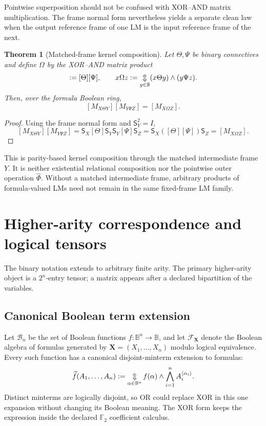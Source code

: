 \documentclass[11pt]{article}
\newtheorem{theorem}{Theorem}[section]
\theoremstyle{definition}
\theoremstyle{remark}
\newcommand{\B}{\mathbb B}
\newcommand{\F}{\mathbb F}
\newcommand{\cF}{\mathcal F}
\newcommand{\bigxor}{\mathop{\Updownarrow}\displaylimits}
\begin{document}
Pointwise superposition should not be confused with XOR--AND matrix multiplication.  The frame normal form nevertheless yields a separate clean law when the output reference frame of one LM is the input reference frame of the next.

\begin{theorem}[Matched-frame kernel composition]
Let $\Theta,\Psi$ be binary connectives and define $\Omega$ by the XOR--AND matrix product
\begin{equation}
 [\Omega]:=[\Theta][\Psi],
 \qquad
 x\Omega z:=\bigxor_{y\in\B}(x\Theta y)\land(y\Psi z).
 \label{eq:matchedomega}
\end{equation}
Then, over the formula Boolean ring,
\begin{equation}
 \boxed{[M_{X\Theta Y}][M_{Y\Psi Z}]=[M_{X\Omega Z}].}
 \label{eq:matchedlmproduct}
\end{equation}
\end{theorem}
\begin{proof}
Using the frame normal form and $\mathsf S_Y^2=I$,
\[
 [M_{X\Theta Y}][M_{Y\Psi Z}]
 =\mathsf S_X[\Theta]\mathsf S_Y\mathsf S_Y[\Psi]\mathsf S_Z
 =\mathsf S_X([\Theta][\Psi])\mathsf S_Z
 =[M_{X\Omega Z}].
\]
\end{proof}

This is parity-based kernel composition through the matched intermediate frame $Y$.  It is neither existential relational composition nor the pointwise outer operation $\widehat\Phi$.  Without a matched intermediate frame, arbitrary products of formula-valued LMs need not remain in the same fixed-frame LM family.

\section{Higher-arity correspondence and logical tensors}
\label{sec:higher}

The binary notation extends to arbitrary finite arity.  The primary higher-arity object is a $2^n$-entry tensor; a matrix appears after a declared bipartition of the variables.

\subsection{Canonical Boolean term extension}

Let $\mathcal B_n$ be the set of Boolean functions $f:\B^n\to\B$, and let $\cF_{\mathbf X}$ denote the Boolean algebra of formulas generated by $\mathbf X=(X_1,\ldots,X_n)$ modulo logical equivalence.  Every such function has a canonical disjoint-minterm extension to formulas:
\begin{equation}
 \widetilde f(A_1,\ldots,A_n)
 :=\bigxor_{\alpha\in\B^n}
 f(\alpha)\land\bigwedge_{i=1}^n A_i^{\langle\alpha_i\rangle}.
 \label{eq:canonicalterm}
\end{equation}
Distinct minterms are logically disjoint, so OR could replace XOR in this one expansion without changing its Boolean meaning.  The XOR form keeps the expression inside the declared $\F_2$ coefficient calculus.
\end{document}
